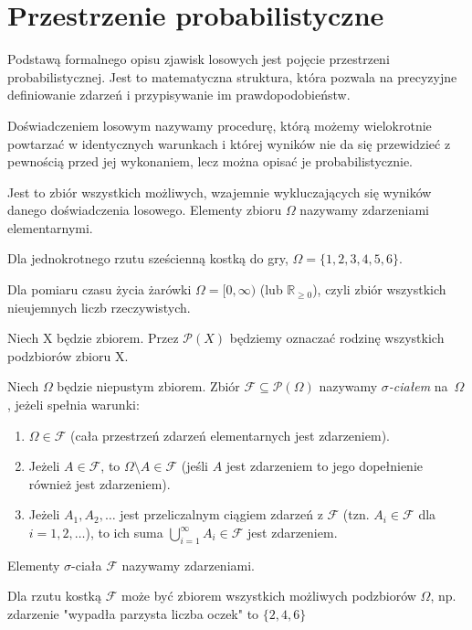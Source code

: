 \documentclass[final,a4paper,openany,12pt]{mwbk}
\begin{document}
\section{Przestrzenie probabilistyczne}

Podstawą formalnego opisu zjawisk losowych jest pojęcie przestrzeni probabilistycznej. Jest to matematyczna struktura, która pozwala na precyzyjne definiowanie zdarzeń i przypisywanie im prawdopodobieństw.

\begin{Def}
Doświadczeniem losowym nazywamy procedurę, którą możemy wielokrotnie powtarzać w identycznych
warunkach i której wyników nie da się przewidzieć z pewnością
przed jej wykonaniem, lecz można opisać je probabilistycznie.
\end{Def}


\begin{Def} Jest to zbiór wszystkich możliwych, wzajemnie wykluczających się wyników danego doświadczenia losowego. Elementy zbioru $\Omega$ nazywamy zdarzeniami elementarnymi.
\end{Def}
\begin{Prz}
    Dla jednokrotnego rzutu sześcienną kostką do gry, $\Omega = \{1, 2, 3, 4, 5, 6\}$.
\end{Prz}
\begin{Prz}
    Dla pomiaru czasu życia żarówki $\Omega = [0, \infty)$ (lub $\mathbb{R}_{\ge 0}$), czyli zbiór wszystkich nieujemnych liczb rzeczywistych.
\end{Prz}

\begin{Ozn}
Niech X będzie zbiorem. Przez $\mathcal{P}(X)$ będziemy oznaczać rodzinę wszystkich podzbiorów zbioru X.
\end{Ozn}

\begin{Def}
Niech $\Omega$ będzie niepustym zbiorem.  Zbiór
$\mathcal{F}\subseteq \mathcal{P}(\Omega)$ nazywamy \emph{$\sigma$-ciałem}
na~$\Omega$, jeżeli spełnia warunki:
    \begin{enumerate}
        \item $\Omega \in \mathcal{F}$ (cała przestrzeń zdarzeń elementarnych jest zdarzeniem).
        \item Jeżeli $A \in \mathcal{F}$, to $\Omega \setminus A \in \mathcal{F}$ (jeśli $A$ jest zdarzeniem to jego dopełnienie również jest zdarzeniem).
        \item Jeżeli $A_1, A_2, \dots$ jest przeliczalnym ciągiem zdarzeń z $\mathcal{F}$ (tzn. $A_i \in \mathcal{F}$ dla $i=1, 2, \dots$), to ich suma $\bigcup_{i=1}^{\infty} A_i \in \mathcal{F}$ jest zdarzeniem.
    \end{enumerate}
    Elementy $\sigma$-ciała $\mathcal{F}$ nazywamy zdarzeniami.
\end{Def}
\begin{Prz}
            Dla rzutu kostką $\mathcal{F}$ może być zbiorem wszystkich możliwych podzbiorów $\Omega$, np. zdarzenie "wypadła parzysta liczba oczek" to $\{2,4,6\}$
\end{Prz}
\end{document}
